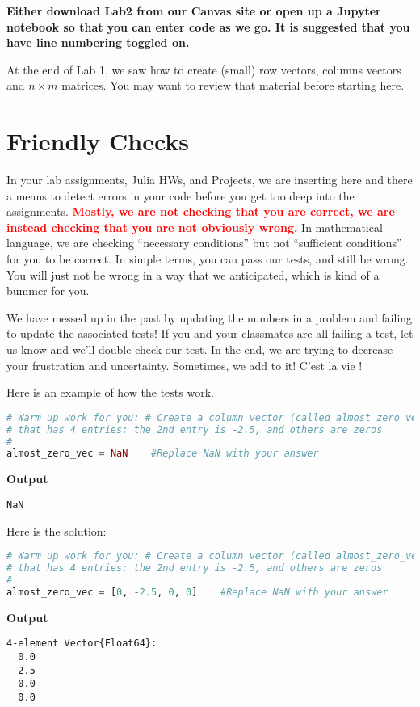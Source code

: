 \vspace*{1cm}

\textbf{Either download Lab2 from our Canvas site or open up a Jupyter notebook so that you can enter code as we go. It is suggested that you have line numbering toggled on.}  

\newpage

At the end of Lab 1, we saw how to create (small) row vectors, columns vectors and $n \times m$ matrices. You may want to review that material before starting here.\\

\section{Friendly Checks}

In your lab assignments, Julia HWs, and Projects, we are inserting here and there a means to detect errors in your code before you get too deep into the assignments. \textcolor{red}{\bf Mostly, we are not checking that you are correct, we are instead checking that you are not obviously wrong.} In mathematical language, we are checking ``necessary conditions'' but not ``sufficient conditions'' for you to be correct. In simple terms, you can pass our tests, and still be wrong. You will just not be wrong in a way that we anticipated, which is kind of a bummer for you. 


\begin{rem} We have messed up in the past by updating the numbers in a problem and failing to update the associated tests! If you and your classmates are all failing a test, let us know and we'll double check our test. In the end, we are trying to decrease your frustration and uncertainty. Sometimes, we add to it! C'est la vie !
\end{rem}

Here is an example of how the tests work.
\begin{lstlisting}[language=Julia,style=mystyle]
# Warm up work for you: # Create a column vector (called almost_zero_vec) 
# that has 4 entries: the 2nd entry is -2.5, and others are zeros
# 
almost_zero_vec = NaN    #Replace NaN with your answer
\end{lstlisting}
\textbf{Output} 
\begin{verbatim}
NaN
\end{verbatim}


Here is the solution:
\begin{lstlisting}[language=Julia,style=mystyle]
# Warm up work for you: # Create a column vector (called almost_zero_vec) 
# that has 4 entries: the 2nd entry is -2.5, and others are zeros
# 
almost_zero_vec = [0, -2.5, 0, 0]    #Replace NaN with your answer
\end{lstlisting}
\textbf{Output} 
\begin{verbatim}
4-element Vector{Float64}:
  0.0
 -2.5
  0.0
  0.0
\end{verbatim}

